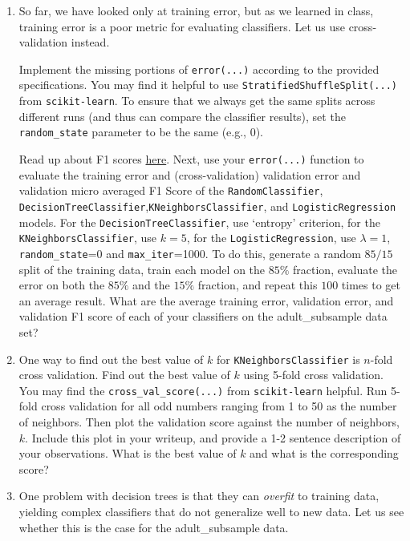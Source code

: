 \documentclass[11pt]{article}
\begin{document}
\begin{enumerate}[resume]
\item {} So far, we have looked only at training error, but as we learned in class, training error is a poor metric for evaluating classifiers. Let us use cross-validation instead.

Implement the missing portions of \verb|error(...)| according to the provided specifications. You may find it helpful to use \verb|StratifiedShuffleSplit(...)| from \verb|scikit-learn|. To ensure that we always get the same splits across different runs (and thus can compare the classifier results), set the \verb|random_state| parameter to be the same (e.g., 0).

Read up about F1 scores \href{https://scikit-learn.org/stable/modules/generated/sklearn.metrics.f1_score.html?highlight=f1\%20score#sklearn.metrics.f1_score}{here}.
Next, use your \verb|error(...)| function to evaluate the training error and (cross-validation) validation error and validation micro averaged F1 Score of the \verb|RandomClassifier|, \verb|DecisionTreeClassifier|,\verb|KNeighborsClassifier|, and \verb|LogisticRegression| models. For the \verb|DecisionTreeClassifier|, use `entropy' criterion, for the \verb|KNeighborsClassifier|, use $k=5$, for the \verb|LogisticRegression|, use $\lambda=1$, \verb|random_state|=0 and \verb|max_iter|=1000. To do this, generate a random $85/15$ split of the training data, train each model on the $85\%$ fraction, evaluate the error on both the $85\%$ and the $15\%$ fraction, and repeat this $100$ times to get an average result. What are the average training error, validation error, and validation F1 score of each of your classifiers on the adult\_subsample data set? \vspace{6cm}


\item {} One way to find out the best value of $k$ for \verb|KNeighborsClassifier| is $n$-fold cross validation.
Find out the best value of $k$ using 5-fold cross validation. You may find the \verb|cross_val_score(...)| from \verb|scikit-learn| helpful. Run 5-fold cross validation for all odd numbers ranging from 1 to 50 as the number of neighbors.
Then plot the validation score against the number of neighbors, $k$.
Include this plot in your writeup, and provide a 1-2 sentence description of your observations. What is the best value of $k$ and what is the corresponding score? \vspace{6cm}


\item {} One problem with decision trees is that they can \emph{overfit} to training data, yielding complex classifiers that do not generalize well to new data. Let us see whether this is the case for the adult\_subsample data.


\end{enumerate}
\end{document}
